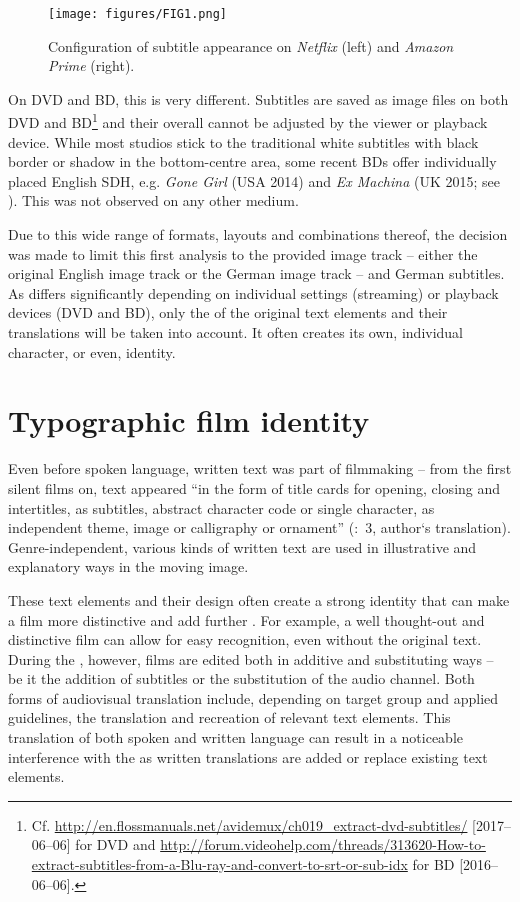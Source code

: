 \begin{figure}
\texttt{[image: figures/FIG1.png]}
\caption{Configuration of subtitle appearance on \textit{Netflix} (left) and \textit{Amazon Prime}  (right).}
\label{fig:FIG1}
\end{figure}

On DVD and BD, this is very different. Subtitles are saved as image files on both DVD and BD\footnote{Cf. \url{http://en.flossmanuals.net/avidemux/ch019\_extract-dvd-subtitles/} [2017--06--06] for DVD and \url{http://forum.videohelp.com/threads/313620-How-to-extract-subtitles-from-a-Blu-ray-and-convert-to-srt-or-sub-idx} for BD [2016--06--06].} and their overall  cannot be adjusted by the viewer or playback device. While most studios stick to the traditional white subtitles with black border or shadow in the bottom-centre area, some recent BDs offer individually placed English SDH, e.g. \textit{Gone Girl} (USA 2014) and \textit{Ex Machina} (UK 2015; see ). This was not observed on any other medium.

Due to this wide range of formats, layouts and combinations thereof, the decision was made to limit this first analysis to the provided image track – either the original English image track or the German image track – and German subtitles. As  differs significantly depending on individual settings (streaming) or playback devices (DVD and BD), only the  of the original text elements and their translations will be taken into account. It often creates its own, individual character, or even, identity.

\section{Typographic film identity}\label{sec:2.3}

Even before spoken language, written text was part of filmmaking – from the first silent films on, text appeared “in the form of title cards for opening, closing and intertitles, as subtitles, abstract character code or single character, as independent theme, image or calligraphy or ornament” (\citealt{Ehrenhauser2007}:~3, author‘s translation). Genre-independent, various kinds of written text are used in illustrative and explanatory ways in the moving image.

These text elements and their design often create a strong identity that can make a film more distinctive and add further . For example, a well thought-out and distinctive film  can allow for easy recognition, even without the original text. During the , however, films are edited both in additive and substituting ways – be it the addition of subtitles or the substitution of the audio channel. Both forms of audiovisual translation include, depending on target group and applied guidelines, the translation and recreation of relevant text elements. This translation of both spoken and written language can result in a noticeable interference with the  as written translations are added or replace existing text elements.

